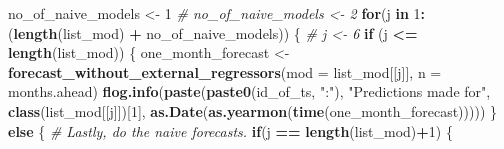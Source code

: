 \documentclass[
]{article}
\newenvironment{Shaded}{\begin{snugshade}}{\end{snugshade}}
\newcommand{\AttributeTok}[1]{\textcolor[rgb]{0.13,0.29,0.53}{#1}}
\newcommand{\CommentTok}[1]{\textcolor[rgb]{0.56,0.35,0.01}{\textit{#1}}}
\newcommand{\ControlFlowTok}[1]{\textcolor[rgb]{0.13,0.29,0.53}{\textbf{#1}}}
\newcommand{\DecValTok}[1]{\textcolor[rgb]{0.00,0.00,0.81}{#1}}
\newcommand{\FunctionTok}[1]{\textcolor[rgb]{0.13,0.29,0.53}{\textbf{#1}}}
\newcommand{\NormalTok}[1]{#1}
\newcommand{\OtherTok}[1]{\textcolor[rgb]{0.56,0.35,0.01}{#1}}
\newcommand{\SpecialCharTok}[1]{\textcolor[rgb]{0.81,0.36,0.00}{\textbf{#1}}}
\newcommand{\StringTok}[1]{\textcolor[rgb]{0.31,0.60,0.02}{#1}}
\begin{document}
\begin{Shaded}
\begin{Highlighting}[]
  
\NormalTok{  no\_of\_naive\_models }\OtherTok{\textless{}{-}} \DecValTok{1}
  \CommentTok{\# no\_of\_naive\_models \textless{}{-} 2}
  \ControlFlowTok{for}\NormalTok{(j }\ControlFlowTok{in} \DecValTok{1}\SpecialCharTok{:}\NormalTok{(}\FunctionTok{length}\NormalTok{(list\_mod) }\SpecialCharTok{+}\NormalTok{ no\_of\_naive\_models)) \{}
    \CommentTok{\# j \textless{}{-} 6}
    \ControlFlowTok{if}\NormalTok{ (j }\SpecialCharTok{\textless{}=} \FunctionTok{length}\NormalTok{(list\_mod)) \{}
\NormalTok{      one\_month\_forecast }\OtherTok{\textless{}{-}} \FunctionTok{forecast\_without\_external\_regressors}\NormalTok{(}\AttributeTok{mod =}\NormalTok{ list\_mod[[j]], }\AttributeTok{n =}\NormalTok{ months.ahead)}
      \FunctionTok{flog.info}\NormalTok{(}\FunctionTok{paste}\NormalTok{(}\FunctionTok{paste0}\NormalTok{(id\_of\_ts, }\StringTok{":"}\NormalTok{), }\StringTok{"Predictions made for"}\NormalTok{, }\FunctionTok{class}\NormalTok{(list\_mod[[j]])[}\DecValTok{1}\NormalTok{], }\FunctionTok{as.Date}\NormalTok{(}\FunctionTok{as.yearmon}\NormalTok{(}\FunctionTok{time}\NormalTok{(one\_month\_forecast)))))}
\NormalTok{    \} }\ControlFlowTok{else}\NormalTok{ \{ }\CommentTok{\# Lastly, do the naive forecasts.}
          \ControlFlowTok{if}\NormalTok{(j }\SpecialCharTok{==} \FunctionTok{length}\NormalTok{(list\_mod)}\SpecialCharTok{+}\DecValTok{1}\NormalTok{) \{}

\end{Highlighting}
\end{Shaded}
\end{document}
